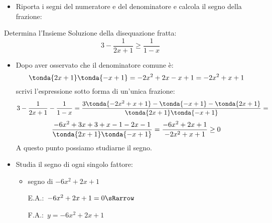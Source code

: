 \begin{esempio}
\begin{itemize}
\begin{itemize}
\end{itemize}
 \item Riporta i segni del numeratore e del denominatore e calcola
il segno della frazione:

\begin{inaccessibleblock}
\vspace{1em}
  \begin{center}
  \segnofrazioneb
  \end{center}
\end{inaccessibleblock}

\end{itemize}
\end{esempio}

\begin{esempio}
Determina l'Insieme Soluzione della disequazione fratta:
\[3-\dfrac{1}{2x+1} \ge \dfrac{1}{1-x}\]

\begin{itemize}

\item Dopo aver osservato che il denominatore comune è:
\[\tonda{2x+1}\tonda{-x+1} = -2x^2 +2x -x +1 = -2x^2 +x +1\]
scrivi l'espressione sotto forma di un'unica frazione:
\[3-\dfrac{1}{2x+1} - \dfrac{1}{1-x} =
  \dfrac{3 \tonda{-2x^2 +x +1} - \tonda{-x+1} - \tonda{2x+1}}
        {\tonda{2x+1}\tonda{-x+1}} =\]
\[\dfrac{-6x^2 +3x +3 +x-1 -2x-1}
        {\tonda{2x+1}\tonda{-x+1}} = 
  \dfrac{-6x^2 +2x +1}
        {-2x^2 +x +1} \ge 0\]
A questo punto possiamo studiarne il segno.

 \item Studia il segno di ogni singolo fattore:

\begin{itemize}

 \item  segno di \(-6x^2 +2x +1\)\\
 \begin{minipage}{.35\textwidth}
  E.A.:~\(-6x^2 +2x +1=0 \sRarrow\)\\
  
  \vspace{1.8em}
 \end{minipage}
 \begin{minipage}{.25\textwidth}
  F.A.:~\(y=-6x^2 +2x +1\)
  \vspace{1.8em}
 \end{minipage}
 \begin{minipage}{.38\textwidth}
  \begin{inaccessibleblock}
\end{inaccessibleblock}
 \end{minipage}
 

\end{itemize}
\end{itemize}
\end{esempio}

